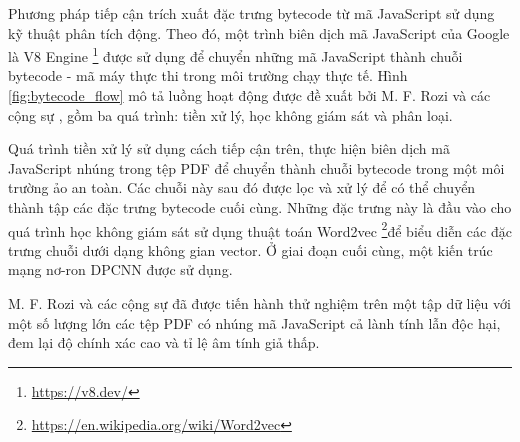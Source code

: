 \documentclass[./../main.tex]{subfiles}
\begin{document}
Phương pháp tiếp cận trích xuất đặc trưng bytecode từ mã JavaScript sử dụng kỹ thuật phân tích động. Theo đó, một trình biên dịch mã JavaScript của Google là V8 Engine \footnote{\url{https://v8.dev/}} được sử dụng để chuyển những mã JavaScript thành chuỗi bytecode - mã máy thực thi trong môi trường chạy thực tế. Hình \ref{fig:bytecode_flow} mô tả luồng hoạt động được đề xuất bởi M. F. Rozi và các cộng sự \cite{bytecode}, gồm ba quá trình: tiền xử lý, học không giám sát và phân loại.

Quá trình tiền xử lý sử dụng cách tiếp cận trên, thực hiện biên dịch mã JavaScript nhúng trong tệp PDF để chuyển thành chuỗi bytecode trong một môi trường ảo an toàn. Các chuỗi này sau đó được lọc và xử lý để có thể chuyển thành tập các đặc trưng bytecode cuối cùng. Những đặc trưng này là đầu vào cho quá trình học không giám sát sử dụng thuật toán Word2vec \footnote{\url{https://en.wikipedia.org/wiki/Word2vec}}để biểu diễn các đặc trưng chuỗi dưới dạng không gian vector. Ở giai đoạn cuối cùng, một kiến trúc mạng nơ-ron DPCNN \cite{dpcnn} được sử dụng.

M. F. Rozi và các cộng sự \cite{bytecode} đã được tiến hành thử nghiệm trên một tập dữ liệu với một số lượng lớn các tệp PDF có nhúng mã JavaScript cả lành tính lẫn độc hại, đem lại độ chính xác cao và tỉ lệ âm tính giả thấp.
\end{document}

